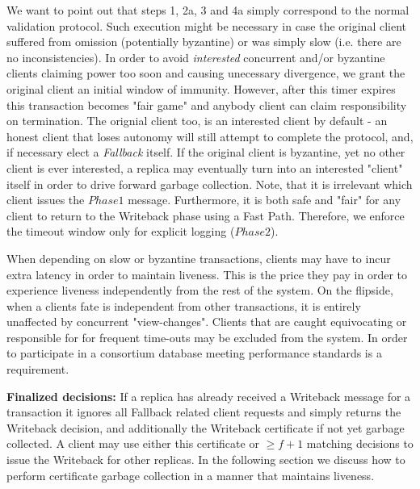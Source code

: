 We want to point out that steps 1, 2a, 3 and 4a simply correspond to the normal validation protocol. Such execution might be necessary in case the original client suffered from omission (potentially byzantine) or was simply slow (i.e. there are no inconsistencies). In order to avoid \textit{interested} concurrent and/or byzantine clients claiming power too soon and causing unecessary divergence, we grant the original client an initial window of immunity.
However, after this timer expires this transaction becomes "fair game" and anybody client can claim responsibility on termination. The orignial client too, is an interested client by default - an honest client that loses autonomy will still attempt to complete the protocol, and, if necessary elect a \textit{Fallback} itself. If the original client is byzantine, yet no other client is ever interested, a replica may eventually turn into an interested "client" itself in order to drive forward garbage collection.
Note, that it is irrelevant which client issues the $Phase1$ message. Furthermore, it is both safe and "fair" for any client to return to the Writeback phase using a Fast Path. Therefore, we enforce the timeout window only for explicit logging ($Phase2$). 

When depending on slow or byzantine transactions, clients may have to incur extra latency in order to maintain liveness. 
This is the price they pay in order to experience liveness independently from the rest of the system. On the flipside, when a clients fate is independent from other transactions, it is entirely unaffected by concurrent "view-changes". Clients that are caught equivocating or responsible for for frequent time-outs may be excluded from the system. In order to participate in a consortium database meeting performance standards is a requirement.


\textbf{Finalized decisions:} If a replica has already received a Writeback message for a transaction it ignores all Fallback related client requests and simply returns the Writeback decision, and additionally the Writeback certificate if not yet garbage collected. A client may use either this certificate or $\geq f+1$ matching decisions to issue the Writeback for other replicas. In the following section we discuss how to perform certificate garbage collection in a manner that maintains liveness.

